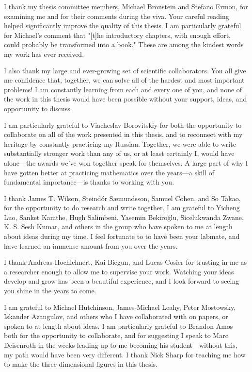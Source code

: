 \documentclass[11pt]{book}
\begin{document}
I thank my thesis committee members, Michael Bronstein and Stefano Ermon, for examining me and for their comments during the viva.
Your careful reading helped significantly improve the quality of this thesis.
I am particularly grateful for Michael's comment that "[t]he introductory chapters, with enough effort, could probably be transformed into a book." 
These are among the kindest words my work has ever received.

I also thank my large and ever-growing set of scientific collaborators.
You all give me confidence that, together, we can solve all of the hardest and most important problems!
I am constantly learning from each and every one of you, and none of the work in this thesis would have been possible without your support, ideas, and opportunity to discuss.

I am particularly grateful to Viacheslav Borovitskiy for both the opportunity to collaborate on all of the work presented in this thesis, and to reconnect with my heritage by constantly practicing my Russian.
Together, we were able to write substantially stronger work than any of us, or at least certainly I, would have alone---the awards we've won together speak for themselves.
A large part of why I have gotten better at practicing mathematics over the years---a skill of fundamental importance---is thanks to working with you.

I thank James T. Wilson, Steindór Sæmundsson, Samuel Cohen, and So Takao, for the opportunity to do research and write together. 
I am grateful to Yicheng Luo, Sanket Kamthe, Hugh Salimbeni, Yasemin Bekiroğlu, Sicelukwanda Zwane, K. S. Sesh Kumar, and others in the group who have spoken to me at length about ideas during my time.
I feel fortunate to to have been your labmate, and have learned an immense amount from you over the years.

I thank Andreas Hochlehnert, Kai Biegun, and Lucas Cosier for trusting in me as a researcher enough to allow me to supervise your work. 
Watching your ideas develop and grow has been a beautiful experience, and I look forward to seeing you shine in the years to come.

I am grateful to Michael Hutchinson, James-Michael Leahy, Peter Mostowsky, Iskander Azangulov, and others who I have collaborated with on papers, or spoken to at length about ideas.
I am particularly grateful to Brandon Amos both for the opportunity to collaborate, and for suggesting I speak to Marc Deisenroth in the weeks leading up to me becoming his student---without this, my path would have been very different.
I thank Nick Sharp for teaching me how to make the three-dimensional figures in this thesis.
\end{document}
